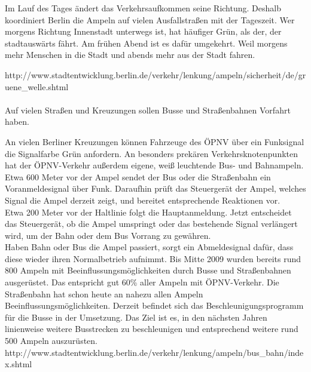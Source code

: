 Im Lauf des Tages ändert das Verkehrsaufkommen seine Richtung. Deshalb koordiniert Berlin die Ampeln auf vielen Ausfallstraßen mit der Tageszeit. Wer morgens Richtung Innenstadt unterwegs ist, hat häufiger Grün, als der, der stadtauswärts fährt. Am frühen Abend ist es dafür umgekehrt. Weil morgens mehr Menschen in die Stadt und abends mehr aus der Stadt fahren.

http://www.stadtentwicklung.berlin.de/verkehr/lenkung/ampeln/sicherheit/de/gruene_welle.shtml\\\\

Auf vielen Straßen und Kreuzungen sollen Busse und Straßenbahnen Vorfahrt haben.


An vielen Berliner Kreuzungen können Fahrzeuge des ÖPNV über ein Funksignal die Signalfarbe Grün anfordern. An besonders prekären Verkehrsknotenpunkten hat der ÖPNV-Verkehr außerdem eigene, weiß leuchtende Bus- und Bahnampeln.
Etwa 600 Meter vor der Ampel sendet der Bus oder die Straßenbahn ein Voranmeldesignal über Funk. Daraufhin prüft das Steuergerät der Ampel, welches Signal die Ampel derzeit zeigt, und bereitet entsprechende Reaktionen vor.\\
Etwa 200 Meter vor der Haltlinie folgt die Hauptanmeldung. Jetzt entscheidet das Steuergerät, ob die Ampel umspringt oder das bestehende Signal verlängert wird, um der Bahn oder dem Bus Vorrang zu gewähren.\\
Haben Bahn oder Bus die Ampel passiert, sorgt ein Abmeldesignal dafür, dass diese wieder ihren Normalbetrieb aufnimmt.
Bis Mitte 2009 wurden bereits rund 800 Ampeln mit Beeinflussungsmöglichkeiten durch Busse und Straßenbahnen ausgerüstet. Das entspricht gut 60\% aller Ampeln mit ÖPNV-Verkehr. Die Straßenbahn hat schon heute an nahezu allen Ampeln Beeinflussungsmöglichkeiten. Derzeit befindet sich das Beschleunigungsprogramm für die Busse in der Umsetzung. Das Ziel ist es, in den nächsten Jahren linienweise weitere Busstrecken zu beschleunigen und entsprechend weitere rund 500 Ampeln auszurüsten.\\
http://www.stadtentwicklung.berlin.de/verkehr/lenkung/ampeln/bus_bahn/index.shtml
